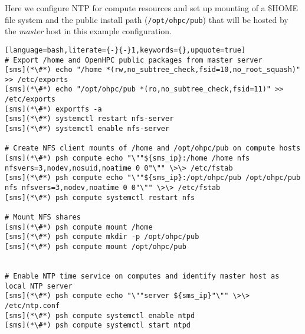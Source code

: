 Here we configure NTP for compute resources and set up \NFS{}  mounting of a
\$HOME file system and the public \OHPC{} install path (\texttt{/opt/ohpc/pub})
that will be hosted by the {\em master} host in this  example configuration.

\vspace*{0.15cm}
\begin{lstlisting}[language=bash,literate={-}{-}1,keywords={},upquote=true]
# Export /home and OpenHPC public packages from master server
[sms](*\#*) echo "/home *(rw,no_subtree_check,fsid=10,no_root_squash)" >> /etc/exports
[sms](*\#*) echo "/opt/ohpc/pub *(ro,no_subtree_check,fsid=11)" >> /etc/exports
[sms](*\#*) exportfs -a
[sms](*\#*) systemctl restart nfs-server
[sms](*\#*) systemctl enable nfs-server

# Create NFS client mounts of /home and /opt/ohpc/pub on compute hosts
[sms](*\#*) psh compute echo "\""${sms_ip}:/home /home nfs nfsvers=3,nodev,nosuid,noatime 0 0"\"" \>\> /etc/fstab
[sms](*\#*) psh compute echo "\""${sms_ip}:/opt/ohpc/pub /opt/ohpc/pub nfs nfsvers=3,nodev,noatime 0 0"\"" \>\> /etc/fstab
[sms](*\#*) psh compute systemctl restart nfs

# Mount NFS shares
[sms](*\#*) psh compute mount /home
[sms](*\#*) psh compute mkdir -p /opt/ohpc/pub
[sms](*\#*) psh compute mount /opt/ohpc/pub


# Enable NTP time service on computes and identify master host as local NTP server
[sms](*\#*) psh compute echo "\""server ${sms_ip}"\"" \>\> /etc/ntp.conf
[sms](*\#*) psh compute systemctl enable ntpd
[sms](*\#*) psh compute systemctl start ntpd

\end{lstlisting}

